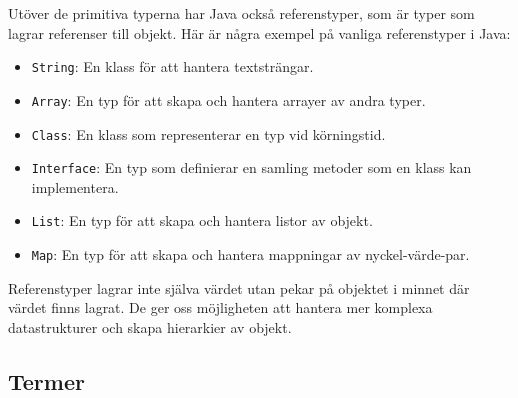Utöver de primitiva typerna har Java också referenstyper, som är typer
som lagrar referenser till objekt. Här är några exempel på vanliga
referenstyper i Java:

\begin{itemize}
\tightlist
\item
  \texttt{String}: En klass för att hantera textsträngar.
\item
  \texttt{Array}: En typ för att skapa och hantera arrayer av andra
  typer.
\item
  \texttt{Class}: En klass som representerar en typ vid körningstid.
\item
  \texttt{Interface}: En typ som definierar en samling metoder som en
  klass kan implementera.
\item
  \texttt{List}: En typ för att skapa och hantera listor av objekt.
\item
  \texttt{Map}: En typ för att skapa och hantera mappningar av
  nyckel-värde-par.
\end{itemize}

Referenstyper lagrar inte själva värdet utan pekar på objektet i minnet
där värdet finns lagrat. De ger oss möjligheten att hantera mer komplexa
datastrukturer och skapa hierarkier av objekt.

\hypertarget{termer}{%
\subsection{Termer}\label{termer}}

